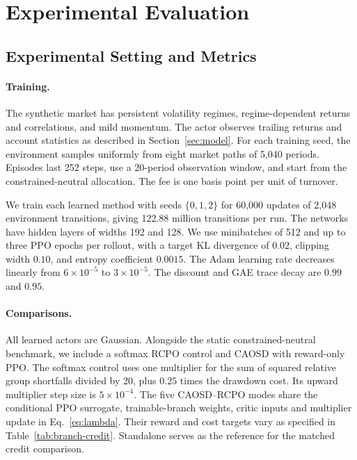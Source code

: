 \documentclass[10pt]{article}
\begin{document}
\section{Experimental Evaluation}
\label{sec:experiments}

\subsection{Experimental Setting and Metrics}

\paragraph{Training.}
The synthetic market has persistent volatility regimes, regime-dependent returns and correlations, and mild momentum. The actor observes trailing returns and account statistics as described in Section~\ref{sec:model}. For each training seed, the environment samples uniformly from eight market paths of 5,040 periods. Episodes last 252 steps, use a 20-period observation window, and start from the constrained-neutral allocation. The fee is one basis point per unit of turnover.

We train each learned method with seeds $\{0,1,2\}$ for 60,000 updates of 2,048 environment transitions, giving 122.88 million transitions per run. The networks have hidden layers of widths 192 and 128. We use minibatches of 512 and up to three PPO epochs per rollout, with a target KL divergence of $0.02$, clipping width $0.10$, and entropy coefficient $0.0015$. The Adam learning rate decreases linearly from $6\times10^{-5}$ to $3\times10^{-5}$. The discount and GAE trace decay are $0.99$ and $0.95$.

\paragraph{Comparisons.}
All learned actors are Gaussian. Alongside the static constrained-neutral benchmark, we include a softmax RCPO control and CAOSD with reward-only PPO. The softmax control uses one multiplier for the sum of squared relative group shortfalls divided by 20, plus $0.25$ times the drawdown cost. Its upward multiplier step size is $5\times10^{-4}$. The five CAOSD--RCPO modes share the conditional PPO surrogate, trainable-branch weights, critic inputs and multiplier update in Eq.~\eqref{eq:lambda}. Their reward and cost targets vary as specified in Table~\ref{tab:branch-credit}. Standalone serves as the reference for the matched credit comparison.
\end{document}

